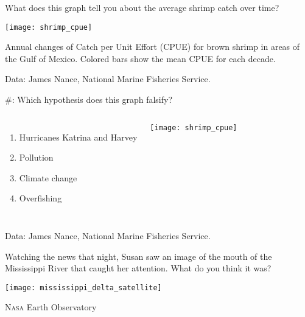 \documentclass[t]{beamer}
\newcommand*{\cq}[1]{%
	\#{\lining#1}:%
}
\begin{document}
%
%		
%		
%		
%		
%
\begin{frame}{What does this graph tell you about the average shrimp catch over time?}

	\vspace*{-\baselineskip}
	
	{\centering\texttt{[image: shrimp\_cpue]}\par
	}

	{\small Annual changes of Catch per Unit Effort (CPUE) for brown shrimp in areas of the Gulf of Mexico. Colored bars show the mean CPUE for each decade.}
	
	\vfilll
	
	\hfill \tiny Data: James Nance, National Marine Fisheries Service.
\end{frame}
%
\begin{frame}{\cq{2} Which hypothesis does this graph falsify?}

	\begin{columns}[t]

			\begin{enumerate}
				\item Hurricanes Katrina and Harvey
				\item Pollution
				\item Climate change
				\item Overfishing
			\end{enumerate}
			

			\texttt{[image: shrimp\_cpue]}

	\end{columns}

	\vfilll
	
	\hfill \tiny Data: James Nance, National Marine Fisheries Service.
\end{frame}
%
\begin{frame}
	Watching the news that night, Susan saw 
	an image of the mouth of the 
	Mississippi River that caught her attention. What do you think it was?

	\texttt{[image: mississippi\_delta\_satellite]}

	\vfilll

	\hfill \tiny \textsc{Nasa} Earth Observatory
\end{frame}
\end{document}
